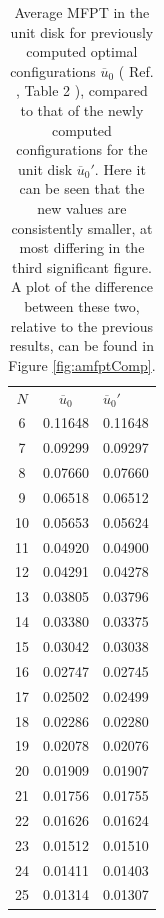 \documentclass[11pt,letter,subeqn,fleqn]{article}
\newcommand{\amfpt}{\overline{u}_0} %
\newcommand{\wardTab}{2 }
\begin{document}
\begin{table}[H]
\begin{center}
\begin{tabular}{| c | c | l |}
\hline
$N$ & $\amfpt$ & $\amfpt'$ \\
6 & 0.11648 & 0.11648 \\
7 & 0.09299 & 0.09297 \\
8 & 0.07660 & 0.07660 \\
9 & 0.06518 & 0.06512 \\
10 & 0.05653 & 0.05624 \\
11 & 0.04920 & 0.04900 \\
12 & 0.04291 & 0.04278 \\
13 & 0.03805 & 0.03796 \\
14 & 0.03380 & 0.03375 \\
15 & 0.03042 & 0.03038 \\
16 & 0.02747 & 0.02745 \\
17 & 0.02502 & 0.02499 \\
18 & 0.02286 & 0.02280 \\
19 & 0.02078 & 0.02076 \\
20 & 0.01909 & 0.01907 \\
21 & 0.01756 & 0.01755 \\
22 & 0.01626 & 0.01624 \\
23 & 0.01512 & 0.01510 \\
24 & 0.01411 & 0.01403 \\
25 & 0.01314 & 0.01307 \\
\hline
\end{tabular}
\end{center}
\caption{Average MFPT in the unit disk for previously computed optimal configurations $\amfpt$ ( Ref. \cite{kolokolnikov2005optimizing}, Table \wardTab), compared to that of the newly computed configurations for the unit disk $\amfpt'$. Here it can be seen that the new values are consistently smaller, at most differing in the third significant figure. A plot of the difference between these two, relative to the previous results, can be found in Figure \ref{fig:amfptComp}.
}
\label{tab:amfptComp}
\end{table}
\end{document}
